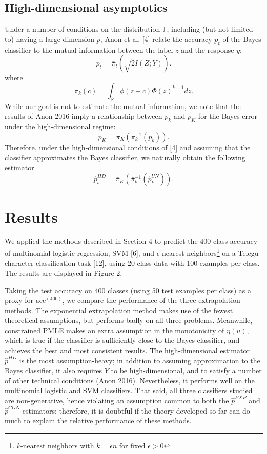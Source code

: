 \documentclass{article}
\begin{document}
\subsection{High-dimensional asymptotics}

Under a number of conditions on the distribution $\mathbb{F}$, including (but not limited to) having a large dimension $p$,
Anon et al. [4] relate the accuracy $p_t$ of the Bayes classifier to the mutual information between the label $z$ and
the response $y$:
\[
p_t = \bar{\pi}_t(\sqrt{2I(Z; Y)}).
\]
where
\[
\bar{\pi}_k(c) = \int_{\mathbb{R}} \phi(z - c)  \Phi(z)^{k-1} dz.
\]
While our goal is not to estimate the mutual information, we note that the results of Anon 2016
imply a relationship between $p_k$ and $p_K$ for the Bayes error under the high-dimensional regime:
\[
p_K = \bar{\pi}_K\left(\bar{\pi}_k^{-1}(p_k)\right).
\]
Therefore, under the high-dimensional conditions of [4] and assuming that the classifier approximates
the Bayes classifier, we naturally obtain the following estimator
\[
\hat{p}_t^{HD} = \bar{\pi}_K\left(\bar{\pi}_k^{-1}(\hat{p}_k^{UN})\right).
\]

\section{Results}

We applied the methods described in Section 4 to predict the 400-class accuracy of multinomial
logistic regression, SVM [6], and $\epsilon$-nearest neighbors\footnote{$k$-nearest neighbors with $k = \epsilon n$ for fixed $\epsilon > 0$} on a Telegu character classification task [12],
using 20-class data with 100 examples per class.  The results are displayed in Figure 2.

Taking the test accuracy on 400 classes (using 50 test examples per class) as a proxy for $\text{acc}^{(400)}$,
we compare the performance of the three extrapolation methods.
The exponential extrapolation method makes use of the fewest theoretical assumptions,
but performs badly on all three problems.  Meanwhile, constrained PMLE makes an extra assumption
in the monotonicity of $\eta(u)$, which is true if the classifier is sufficiently close to the Bayes classifier,
and achieves the best and most consistent results.  The high-dimensional estimator $\hat{p}^{HD}$ is
the most assumption-heavy; in addition to assuming approximation to the Bayes classifier,
it also requires $Y$ to be high-dimensional, and to satisfy a number of other technical conditions (Anon 2016).
Nevertheless, it performs well on the multinomial logistic and SVM classifiers.
That said, all three classifiers studied are non-generative, hence violating an assumption common to both the $\hat{p}^{EXP}$
and $\hat{p}^{CON}$ estimators: therefore, it is doubtful if the theory developed so far can do much to explain
the relative performance of these methods.  
\end{document}
